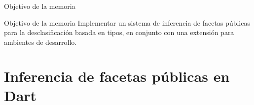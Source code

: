 \documentclass[aspectratio=169,10pt]{beamer}
\begin{document}
%
%

\begin{frame}[fragile]{Objetivo de la memoria}
	\begin{block}{Objetivo de la memoria}
		Implementar un sistema de inferencia de facetas públicas para la desclasificación basada en tipos, en conjunto con una extensión para ambientes de desarrollo.
	\end{block}
\end{frame}

\section{Inferencia de facetas públicas en Dart}
\end{document}
